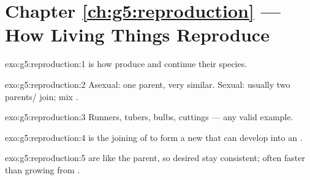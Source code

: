 \section*{Chapter \ref{ch:g5:reproduction} --- How Living Things Reproduce}

\begin{solution}{exo:g5:reproduction:1}
 is how  produce  and continue their
species.
\end{solution}

\begin{solution}{exo:g5:reproduction:2}
Asexual: one parent,  very similar. Sexual: usually two
parents/ join;  mix .
\end{solution}

\begin{solution}{exo:g5:reproduction:3}
Runners, tubers, bulbs, cuttings --- any valid example.
\end{solution}

\begin{solution}{exo:g5:reproduction:4}
 is the joining of  to form a new  that can
develop into an .
\end{solution}

\begin{solution}{exo:g5:reproduction:5}
 are like the parent, so desired  stay consistent; often
faster than growing from .
\end{solution}

